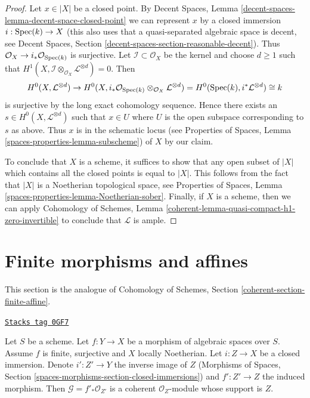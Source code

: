 \begin{proof}
\medskip\noindent
Let $x \in |X|$ be a closed point. By Decent Spaces, Lemma
\ref{decent-spaces-lemma-decent-space-closed-point}
we can represent $x$ by a closed immersion $i : \operatorname{Spec}(k) \to X$
(this also uses that a quasi-separated algebraic space is
decent, see Decent Spaces, Section
\ref{decent-spaces-section-reasonable-decent}).
Thus $\mathcal{O}_X \to i_*\mathcal{O}_{\operatorname{Spec}(k)}$ is surjective.
Let $\mathcal{I} \subset \mathcal{O}_X$ be the kernel and choose
$d \geq 1$ such that
$H^1(X, \mathcal{I} \otimes_{\mathcal{O}_X} \mathcal{L}^{\otimes d}) = 0$.
Then
$$
H^0(X, \mathcal{L}^{\otimes d}) \to
H^0(X,
i_*\mathcal{O}_{\operatorname{Spec}(k)} \otimes_{\mathcal{O}_X} \mathcal{L}^{\otimes d}) =
H^0(\operatorname{Spec}(k), i^*\mathcal{L}^{\otimes d}) \cong k
$$
is surjective by the long exact cohomology sequence. Hence
there exists an $s \in H^0(X, \mathcal{L}^{\otimes d})$
such that $x \in U$ where $U$ is the open subspace corresponding to $s$
as above. Thus $x$ is in the schematic locus
(see Properties of Spaces, Lemma \ref{spaces-properties-lemma-subscheme})
of $X$ by our claim.

\medskip\noindent
To conclude that $X$ is a scheme, it suffices to show that
any open subset of $|X|$ which contains all the closed points
is equal to $|X|$. This follows from the fact that $|X|$
is a Noetherian topological space, see
Properties of Spaces, Lemma \ref{spaces-properties-lemma-Noetherian-sober}.
Finally, if $X$ is a scheme, then we can apply
Cohomology of Schemes, Lemma
\ref{coherent-lemma-quasi-compact-h1-zero-invertible}
to conclude that $\mathcal{L}$ is ample.
\end{proof}

\section{Finite morphisms and affines}
\label{spaces-cohomology-section-finite-affine}
This section is the analogue of
Cohomology of Schemes, Section \ref{coherent-section-finite-affine}.

\begin{lemma}
\label{spaces-cohomology-lemma-finite-morphism-Noetherian}
\href{https://stacks.math.columbia.edu/tag/0GF7}{\texttt{Stacks tag 0GF7}}

Let $S$ be a scheme. Let $f : Y \to X$ be a morphism of algebraic spaces
over $S$. Assume $f$ is finite, surjective and $X$ locally Noetherian.
Let $i : Z \to X$ be a closed immersion. Denote $i' : Z' \to Y$
the inverse image of $Z$
(Morphisms of Spaces, Section \ref{spaces-morphisms-section-closed-immersions})
and $f' : Z' \to Z$
the induced morphism. Then $\mathcal{G} = f'_*\mathcal{O}_{Z'}$
is a coherent $\mathcal{O}_Z$-module whose support is $Z$.
\end{lemma}

